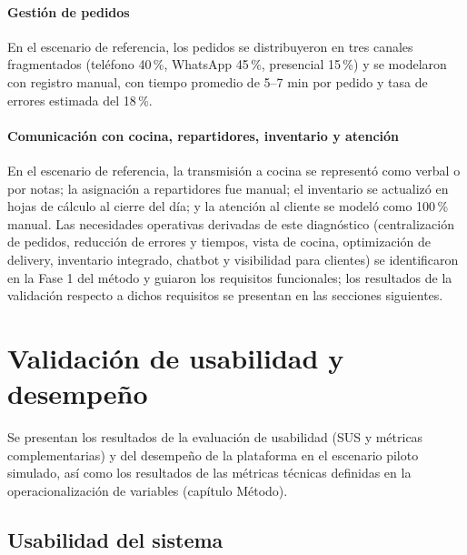 \paragraph{Gestión de pedidos} En el escenario de referencia, los pedidos se distribuyeron en tres canales fragmentados (teléfono 40\,\%, WhatsApp 45\,\%, presencial 15\,\%) y se modelaron con registro manual, con tiempo promedio de 5--7 min por pedido y tasa de errores estimada del 18\,\%.

\paragraph{Comunicación con cocina, repartidores, inventario y atención} En el escenario de referencia, la transmisión a cocina se representó como verbal o por notas; la asignación a repartidores fue manual; el inventario se actualizó en hojas de cálculo al cierre del día; y la atención al cliente se modeló como 100\,\% manual. Las necesidades operativas derivadas de este diagnóstico (centralización de pedidos, reducción de errores y tiempos, vista de cocina, optimización de delivery, inventario integrado, chatbot y visibilidad para clientes) se identificaron en la Fase 1 del método y guiaron los requisitos funcionales; los resultados de la validación respecto a dichos requisitos se presentan en las secciones siguientes.

\section{Validación de usabilidad y desempeño}

Se presentan los resultados de la evaluación de usabilidad (SUS y métricas complementarias) y del desempeño de la plataforma en el escenario piloto simulado, así como los resultados de las métricas técnicas definidas en la operacionalización de variables (capítulo Método).

\subsection{Usabilidad del sistema}

